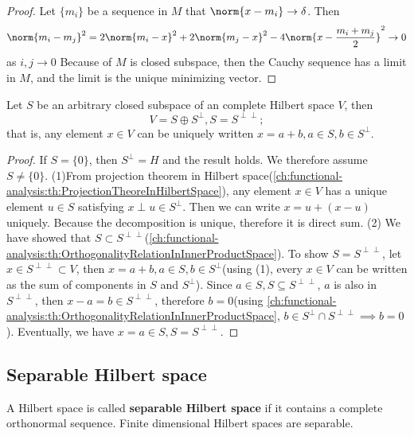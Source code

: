 \begin{refsection}
\begin{proof}
	Let $\{m_i\}$ be a sequence in $M$ that $\norm{x-m_i} \to \delta$. Then
	$$\norm{m_i-m_j}^2 = 2\norm{m_i-x}^2 + 2\norm{m_j-x}^2 - 4\norm{x-\frac{m_i+m_j}{2}}^2 \to 0$$ as $i,j\to 0$
	Because of $M$ is closed subspace, then the Cauchy sequence has a limit in $M$, and the limit is the unique minimizing vector.	
\end{proof}


\begin{theorem}\cite[68]{christensen2010functions}
	\cite[53]{luenberger1969optimization}Let $S$ be an arbitrary closed subspace of an complete Hilbert space $V$, then $$V=S\oplus S^{\perp},S = S^{\perp\perp};$$
	that is, any element $x\in V$ can be uniquely written $x=a+b,a\in S,b\in S^{\perp}$. 
\end{theorem}
\begin{proof}
If $S = \{0\}$, then $S^\perp = H$ and the result holds. We therefore assume $S\neq \{0\}$.	
	(1)From projection theorem in Hilbert space(\autoref{ch:functional-analysis:th:ProjectionTheoreInHilbertSpace}), any element $x\in V$ has a unique element $u\in S$ satisfying $x \perp u \in S^{\perp}$.
	Then we can write $x = u + (x - u)$ uniquely.
	 Because the decomposition is unique, therefore it is direct sum.  
	(2) We have showed that $S\subset S^{\perp\perp}$(\autoref{ch:functional-analysis:th:OrthogonalityRelationInInnerProductSpace}). To show $S = S^{\perp\perp}$, let $x\in S^{\perp\perp} \subset V$, then $x = a+b,a\in S,b\in S^\perp$(using (1), every $x\in V$ can be written as the sum of components in $S$ and $S^\perp$). Since $a\in S, S\subseteq S^{\perp\perp}$, $a$ is also in $ S^{\perp\perp}$, then $x-a  = b \in S^{\perp\perp}$, therefore $b = 0$(using \autoref{ch:functional-analysis:th:OrthogonalityRelationInInnerProductSpace}, $b\in S^{\perp}\cap S^{\perp\perp} \implies b = 0$). Eventually, we have  $x=a\in S, S = S^{\perp\perp}$.
\end{proof}




\subsection{Separable Hilbert space}
\begin{definition}
\cite[127]{debnath2005hilbert} A Hilbert space is called \textbf{separable Hilbert space} if it contains a complete orthonormal sequence. Finite dimensional Hilbert spaces are separable.
\end{definition}


\end{refsection}

